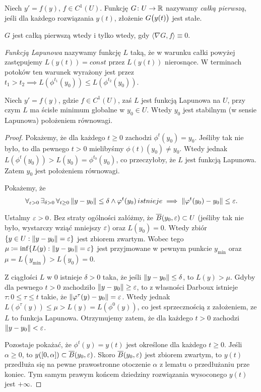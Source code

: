 %
\begin{definition}
  Niech $y' = f(y)$, $f \in C^1(U)$. Funkcję $G \colon U \to \R$ nazywamy \emph{całką pierwszą}, jeśli dla każdego 
  rozwiązania $y(t)$, złożenie $G \p[\big]{y(t)}$ jest stałe.
\end{definition}
%
\begin{lemma}
  $G$ jest całką pierwszą wtedy i tylko wtedy, gdy $\langle \nabla G, f \rangle \equiv 0$.
\end{lemma}
%
\begin{definition}
	\emph{Funkcją Lapunowa} nazywamy funkcję $L$ taką, że w warunku całki powyżej zastępujemy
	$L(y(t)) = const$ przez $L(y(t))$ nierosnące. W terminach potoków ten warunek wyrażony jest przez 
	$t_1 > t_2 \implies L(\phi^{t_1}(y_0)) \le L(\phi^{t_2}(y_0))$.
\end{definition}
%
\begin{theorem}
	Niech $y' = f(y)$, gdzie $f \in C^1(U)$, zaś $L$ jest funkcją Lapunowa na $U$, przy czym $L$ ma ścisłe minimum
	globalne w $y_0 \in U$. Wtedy $y_0$ jest stabilnym (w sensie Lapunowa) położeniem równowagi.
\end{theorem}
%
\begin{proof}
	Pokażemy, że dla każdego $t \ge 0$ zachodzi $\phi^t(y_0) = y_0$. Jeśliby tak nie było, to dla pewnego $t > 0$
	mielibyśmy $\phi(t)(y_0) \ne y_0$. Wtedy jednak $L(\phi^t(y_0)) > L(y_0) = \phi^{t_0}(y_0)$, co przeczyłoby, że
	$L$ jest funkcją Lapunowa. Zatem $y_0$ jest położeniem równowagi.
	
	Pokażemy, że
	\begin{equation*}
	\forall_{\eps > 0} \, \exists_{\delta > 0} \, \forall_{t \ge 0} \, \norm{ y - y_0} \le \delta \land \phi^t(y_0) \,  istnieje  \implies \norm{ \phi^t( y_0 ) - y_0 } \le \eps .
	\end{equation*}
	
	Ustalmy $\eps > 0$. Bez straty ogólności załóżmy, że $\overline{B}(y_0, \eps) \subset U$ (jeśliby tak nie było, wystarczy 
	wziąć mniejszy $\eps$) oraz $L(y_0) = 0$. Wtedy zbiór $\{ y \in U : \norm{ y - y_0 } = \eps \}$ jest zbiorem zwartym.
	Wobec tego $\mu \coloneqq \inf\{ L(y) : \norm{ y - y_0 } = \eps \}$ jest przyjmowane w pewnym punkcie $y_{\min}$ oraz
	$\mu = L(y_{\min}) > L(y_0) = 0$.
	
	Z ciągłości $L$ w 0 istnieje $\delta > 0$ taka, że jeśli $\norm{ y - y_0 } \le \delta$, to $L(y) > \mu$. Gdyby dla pewnego 
	$t > 0$ zachodziło $\norm{ y - y_0 } \ge \eps$, to z własności Darboux istnieje $\tau \colon 0 \le \tau \le t$ takie, że 
	$\norm{ \phi^\tau(y) - y_0 } = \eps$. Wtedy jednak $L(\phi^\tau(y)) \le \mu > L(y) = L(\phi^0(y))$, co jest sprzecznością
	z założeniem, ze $L$ to funkcja Lapunowa. Otrzymujemy zatem, że dla każdego $t>0$ zachodzi $\norm{ y - y_0 } < \eps$.
	
	Pozostaje pokażać, że $\phi^t(y) = y(t)$ jest określone dla każdego $t \ge 0$. Jeśli $\alpha \ge 0$, to $y([0, \alpha]) \subset \overline{B}(y_0, \eps)$. Skoro $\overline{B}(y_0, \eps)$ jest zbiorem zwartym, to $y(t)$ przedłuża się na pewne
	prawostronne otoczenie $\alpha$ z lematu o przedłużaniu prze koniec. Tym samym prawym końcem dziedziny rozwiązania
	wysoconego $y(t)$ jest $+\infty$. 
\end{proof}
%